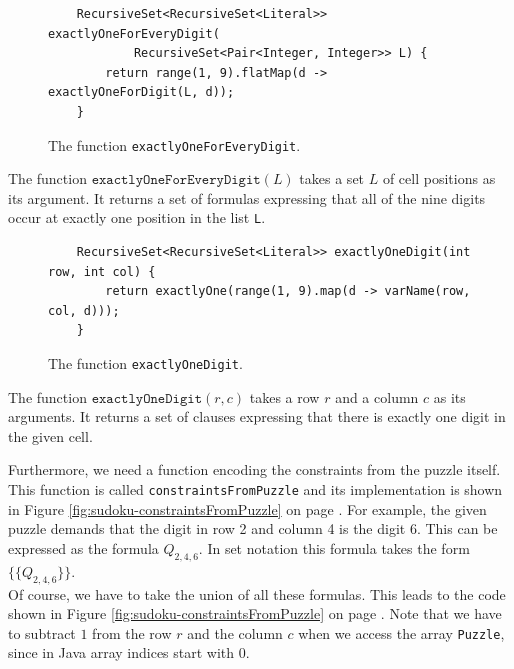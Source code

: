 \begin{figure}[!ht]
\centering
\begin{verbatim}
    RecursiveSet<RecursiveSet<Literal>> exactlyOneForEveryDigit(
            RecursiveSet<Pair<Integer, Integer>> L) {
        return range(1, 9).flatMap(d -> exactlyOneForDigit(L, d));
    }
\end{verbatim}
\vspace*{-0.3cm}
\caption{The function \texttt{exactlyOneForEveryDigit}.}
\label{fig:sudoku-exactlyOneForEveryDigit}
\end{figure}

The function $\texttt{exactlyOneForEveryDigit}(L)$ takes a set $L$ of cell positions as its argument.
It returns a set of formulas expressing that all of the nine digits occur at exactly one position in the list \texttt{L}.

\begin{figure}[!ht]
\centering
\begin{verbatim}
    RecursiveSet<RecursiveSet<Literal>> exactlyOneDigit(int row, int col) {
        return exactlyOne(range(1, 9).map(d -> varName(row, col, d)));
    }
\end{verbatim}
\vspace*{-0.3cm}
\caption{The function \texttt{exactlyOneDigit}.}
\label{fig:sudoku-exactlyOneDigit}
\end{figure}

The function $\mathtt{exactlyOneDigit}(r, c)$ takes a row $r$ and a column $c$ as its arguments.
It returns a set of clauses expressing that there is exactly one digit in the given cell.

Furthermore, we need a function encoding the constraints from the puzzle itself.
This function is called \texttt{constraintsFromPuzzle} and its implementation is shown in Figure
\ref{fig:sudoku-constraintsFromPuzzle} on page \pageref{fig:sudoku-constraintsFromPuzzle}.
For example, the given puzzle demands that the digit in row 2 and column 4 is the digit $6$.
This can be expressed as the formula $Q_{2,4,6}$.  In set notation this formula takes the form
\\[0.2cm]
\hspace*{1.3cm}
$\bigl\{ \{Q_{2,4,6}\} \bigr\}$.
\\[0.2cm]
Of course, we have to take the union of all these formulas.  This leads to the code shown in Figure
\ref{fig:sudoku-constraintsFromPuzzle} on page \pageref{fig:sudoku-constraintsFromPuzzle}.
Note that we have to subtract $1$ from the row $r$ and the column $c$ when we access the array
\texttt{Puzzle}, since in Java array indices start with $0$.

